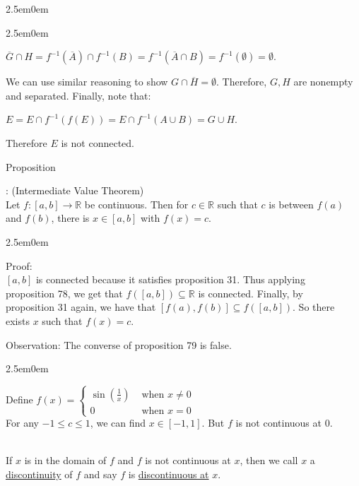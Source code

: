 \documentclass{book}
\newcommand{\hThree}{%
   \color{PineGreen}
   \fontsize{13}{15}\selectfont%
}
\newcommand{\exOne}{%
   \color{Purple}%
   \fontsize{14}{16}\selectfont%
}
\newcommand{\exTwo}{%
   \color{RedViolet}%
   \fontsize{13}{15}\selectfont%
}
\newenvironment{myIndent}{%
   \begin{adjustwidth}{2.5em}{0em}%
}{%
   \end{adjustwidth}%
}
\newcommand{\udefine}[1]{%
   \setulcolor{Red}%
   \setul{0.14em}{0.07em}%
   \ul{#1}%
}
\newcommand{\retTwo}{\hfill\bigbreak}
\newcounter{PropNumber}
\newcommand{\propCount}[1][1]{%
   \addtocounter{PropNumber}{#1}%
   \thePropNumber%
}
\newcommand{\mySepTwo}[1][.]{%
   {\noindent\color{#1}{\rule{6.5in}{0.5mm}}}\\%
}
\begin{document}
{\begin{myIndent}
{\begin{myIndent}
         {\centering$\overbar{G} \cap H =  f^{-1}(\overbar{A}) \cap f^{-1}(B) = f^{-1}(\overbar{A} \cap B) = f^{-1}(\emptyset) = \emptyset$.\retTwo\par}

         We can use similar reasoning to show $G \cap \overbar{H} = \emptyset$. Therefore, $G, H$ are nonempty and separated. Finally, note that:
         
         {\centering$E = E \cap f^{-1}(f(E)) = E \cap f^{-1}(A \cup B) = G \cup H$.\retTwo\par}

         Therefore $E$ is not connected. \retTwo
      \end{myIndent}}

      Proposition \propCount: (Intermediate Value Theorem)\\
      Let $f: [a, b] \rightarrow \mathbb{R}$ be continuous. Then for $c \in \mathbb{R}$ such that $c$ is between $f(a)$ and $f(b)$, there is $x \in [a, b]$ with $f(x) = c$.
      \newpage
      \begin{myIndent} \hThree
         Proof:\\
         $[a, b]$ is connected because it satisfies proposition 31. Thus applying\\ proposition 78, we get that $f([a, b]) \subseteq \mathbb{R}$ is connected. Finally, by\\ proposition 31 again, we have that $[f(a), f(b)] \subseteq f([a, b])$. So there\\ exists $x$ such that $f(x) = c$. \retTwo
      \end{myIndent}

      \exOne%
      Observation: The converse of proposition 79 is false.
      \begin{myIndent} \exTwo
         Define $f(x) = \left\{
         \begin{matrix}
            \sin(\frac{1}{x}) & \text{ when } x \neq 0 \\
            0 & \text{ when } x = 0
         \end{matrix}\right.$\\

         For any $-1 \leq c \leq 1$, we can find $x \in [-1, 1]$. But $f$ is not continuous at $0$. \retTwo
      \end{myIndent}
   \end{myIndent}}

   \mySepTwo

   If $x$ is in the domain of $f$ and $f$ is not continuous at $x$, then we call $x$ a \udefine{discontinuity} of $f$ and say $f$ is \udefine{discontinuous at} $x$. \retTwo
\end{document}
